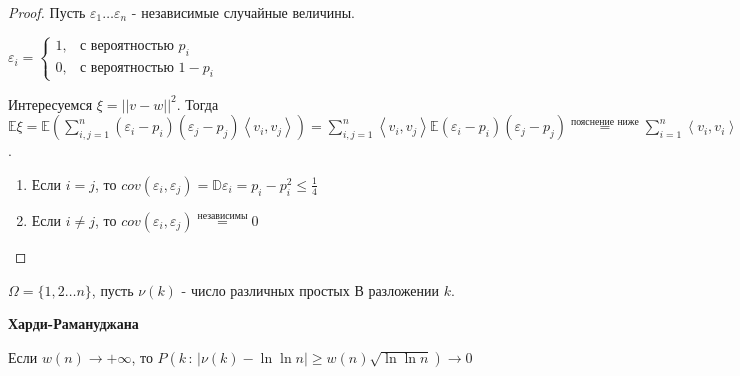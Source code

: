 \begin{proof}
    Пусть $\varepsilon_1 \ldots \varepsilon_n$ - независимые случайные величины.

    $
    \varepsilon_{i} =
    \begin{cases}
        1, & \text{с вероятностью $p_i$} \\
        0, & \text{с вероятностью $1 - p_i$}
    \end{cases}
    $

    Интересуемся $\xi = || v - w ||^2$. Тогда $\mathbb{E} \xi = \mathbb{E} (\sum_{i, j = 1}^n (\varepsilon_i - p_i)(\varepsilon_j - p_j) \left < v_i, v_j \right > ) =
    \sum_{i, j = 1}^{n} \left < v_i, v_j \right > \mathbb{E} (\varepsilon_i - p_i)(\varepsilon_j - p_j) \overset{\text{пояснение ниже}}{=} \sum_{i = 1}^{n} \left < v_i, v_i \right > (p_i - p_i^2) \leqslant \frac{n}{4}$.

    \begin{enumerate}
        \item Если $i = j$, то $cov(\varepsilon_i, \varepsilon_j) = \mathbb{D}\varepsilon_i = p_i - p_i^2 \leqslant \frac{1}{4}$
        \item Если $i \neq j$, то $cov (\varepsilon_i, \varepsilon_j) \overset{\text{независимы}}{=} 0$
    \end{enumerate}
\end{proof}

\begin{example}
    $\Omega = \{ 1, 2 \ldots n \}$, пусть $\nu (k)$ - число различных простых В
    разложении $k$.

    \begin{theorem}
        \textbf{Харди-Рамануджана}

        Если $w(n) \to +\infty$, то $P(k \, : \, | \nu (k) - \ln \ln n| \geqslant w(n) \sqrt{\ln \ln n}) \to 0$
    \end{theorem}
\end{example}

